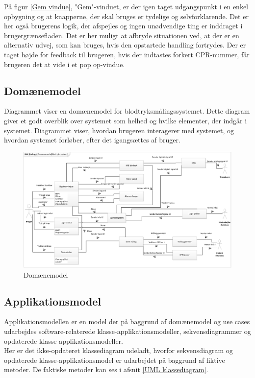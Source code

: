 På figur \ref{Gem vindue}, "Gem"\--vinduet, er der igen taget udgangspunkt i en enkel opbygning og at knapperne, der skal bruges er tydelige og selvforklarende. Det er her også brugerens logik, der afspejles og ingen unødvendige ting er inddraget i brugergrænsefladen. Det er her muligt at afbryde situationen ved, at der er en alternativ udvej, som kan bruges, hvis den opstartede handling fortrydes. Der er taget højde for feedback til brugeren, hvis der indtastes forkert CPR-nummer, får brugeren det at vide i et pop op-vindue. 

\subsection{Domænemodel}
Diagrammet viser en domænemodel for blodtryksmålingssystemet. Dette diagram giver et godt overblik over systemet som helhed og hvilke elementer, der indgår i systemet. Diagrammet viser, hvordan brugeren interagerer med systemet, og hvordan systemet forløber, efter det igangsættes af bruger. 

\begin{figure}[H]
	\centering
	\includegraphics[width=1\textwidth]{Figurer/ISE/Domaenemodel}
	\caption{Domænemodel}
	\label{domaenemodel}
\end{figure}

\subsection{Applikationsmodel}
Applikationsmodellen er en model der på baggrund af domænemodel og use cases udarbejdes software-relaterede klasse-applikationsmodeller, sekvensdiagrammer og opdaterede klasse-applikationsmodeller.\\
Her er det ikke-opdateret klassediagram udeladt, hvorfor sekvensdiagram og opdaterede klasse-applikationsmodel er udarbejdet på baggrund af fiktive metoder. De faktiske metoder kan ses i afsnit \ref{UML klassediagram}.

